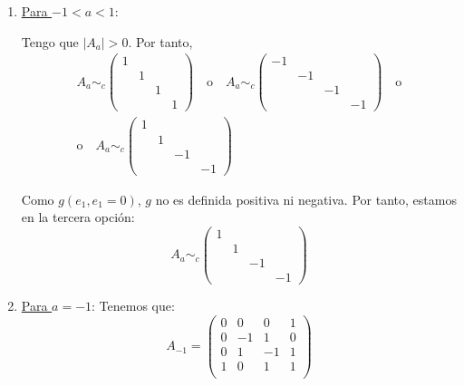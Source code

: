 \begin{ejercicio}
\begin{enumerate}
\begin{enumerate}
            \item \underline{Para $-1<a<1$}:

            Tengo que $|A_a|>0$. Por tanto,
            \begin{gather*}
                A_a \sim_c \left( \begin{array}{cccc}
                1 &&& \\
                &1&& \\
                &&1&\\
                &&&1
            \end{array} \right)
            \quad \text{o} \quad
            A_a \sim_c \left( \begin{array}{cccc}
                -1 &&& \\
                &-1&& \\
                &&-1&\\
                &&&-1
            \end{array} \right)
            \quad \text{o} \\ \text{o} \quad
            A_a \sim_c \left( \begin{array}{cccc}
                1 &&& \\
                &1&& \\
                &&-1&\\
                &&&-1
            \end{array} \right)
            \end{gather*}
            
            Como $g(e_1, e_1=0)$, $g$ no es definida positiva ni negativa. Por tanto, estamos en la tercera opción:
            \begin{equation*}
                A_a \sim_c \left( \begin{array}{cccc}
                    1 &&& \\
                    &1&& \\
                    &&-1&\\
                    &&&-1
                \end{array} \right)
            \end{equation*}



            \item \underline{Para $a=-1$}:
            Tenemos que:
            \begin{equation*}
                A_{-1} = \left( \begin{array}{cccc}
                    0 & 0 & 0 & 1 \\
                    0 & -1 & 1 & 0 \\
                    0 & 1 & -1 & 1 \\
                    1 & 0 & 1 & 1 \\
                \end{array} \right)
            \end{equation*}
            

\end{enumerate}
\end{enumerate}
\end{ejercicio}
